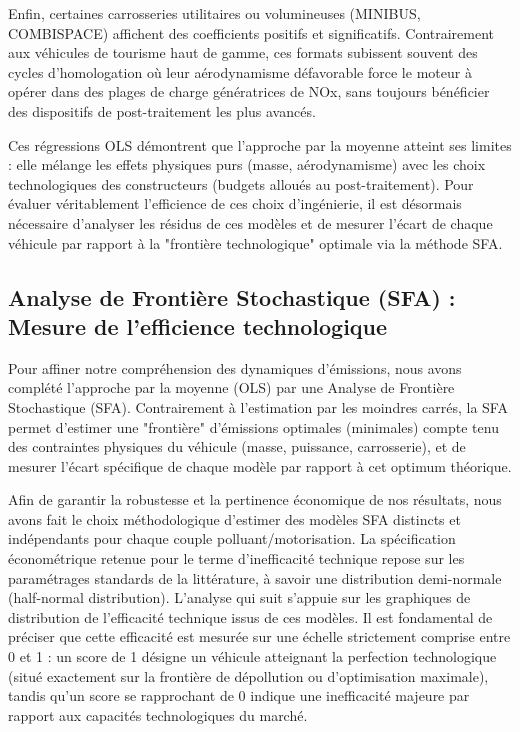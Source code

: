 \vspace{0.6em}

Enfin, certaines carrosseries utilitaires ou volumineuses (MINIBUS, COMBISPACE) affichent des coefficients positifs et significatifs. Contrairement aux véhicules de tourisme haut de gamme, ces formats subissent souvent des cycles d'homologation où leur aérodynamisme défavorable force le moteur à opérer dans des plages de charge génératrices de NOx, sans toujours bénéficier des dispositifs de post-traitement les plus avancés.

\vspace{0.6em}

Ces régressions OLS démontrent que l'approche par la moyenne atteint ses limites : elle mélange les effets physiques purs (masse, aérodynamisme) avec les choix technologiques des constructeurs (budgets alloués au post-traitement). Pour évaluer véritablement l'efficience de ces choix d'ingénierie, il est désormais nécessaire d'analyser les résidus de ces modèles et de mesurer l'écart de chaque véhicule par rapport à la "frontière technologique" optimale via la méthode SFA.

\subsection{Analyse de Frontière Stochastique (SFA) : Mesure de l'efficience technologique}

Pour affiner notre compréhension des dynamiques d'émissions, nous avons complété l'approche par la moyenne (OLS) par une Analyse de Frontière Stochastique (SFA). Contrairement à l'estimation par les moindres carrés, la SFA permet d'estimer une "frontière" d'émissions optimales (minimales) compte tenu des contraintes physiques du véhicule (masse, puissance, carrosserie), et de mesurer l'écart spécifique de chaque modèle par rapport à cet optimum théorique.

\vspace{0.6em}

Afin de garantir la robustesse et la pertinence économique de nos résultats, nous avons fait le choix méthodologique d'estimer des modèles SFA distincts et indépendants pour chaque couple polluant/motorisation. La spécification économétrique retenue pour le terme d'inefficacité technique repose sur les paramétrages standards de la littérature, à savoir une distribution demi-normale (half-normal distribution). L'analyse qui suit s'appuie sur les graphiques de distribution de l'efficacité technique issus de ces modèles. Il est fondamental de préciser que cette efficacité est mesurée sur une échelle strictement comprise entre 0 et 1 : un score de 1 désigne un véhicule atteignant la perfection technologique (situé exactement sur la frontière de dépollution ou d'optimisation maximale), tandis qu'un score se rapprochant de 0 indique une inefficacité majeure par rapport aux capacités technologiques du marché.

